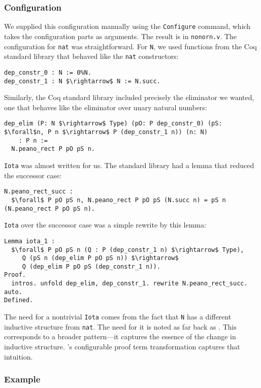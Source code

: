 \subsubsection{Configuration}
We supplied this configuration manually using the \lstinline{Configure} command,
which takes the configuration parts as arguments.
The result is in \lstinline{nonorn.v}.
The configuration for \lstinline{nat} was straightforward.
For \lstinline{N}, we used functions from the Coq standard library that
behaved like the \lstinline{nat} constructors:

\begin{lstlisting}
dep_constr_0 : N := 0%N.
dep_constr_1 : N $\rightarrow$ N := N.succ.
\end{lstlisting}
Similarly, the Coq standard library included precisely the eliminator we wanted, one that behaves
like the eliminator over unary natural numbers:

\begin{lstlisting}
dep_elim (P: N $\rightarrow$ Type) (pO: P dep_constr_0) (pS: $\forall$n, P n $\rightarrow$ P (dep_constr_1 n)) (n: N) 
    : P n :=
  N.peano_rect P pO pS n.
\end{lstlisting}
\lstinline{Iota} was almost written for us.
The standard library had a lemma that reduced the successor case:

\begin{lstlisting}
N.peano_rect_succ :
  $\forall$ P pO pS n, N.peano_rect P pO pS (N.succ n) = pS n (N.peano_rect P pO pS n).
\end{lstlisting}
\lstinline{Iota} over the successor case was a simple rewrite by this lemma:

\begin{lstlisting}
Lemma iota_1 :
  $\forall$ P pO pS n (Q : P (dep_constr_1 n) $\rightarrow$ Type),
     Q (pS n (dep_elim P pO pS n)) $\rightarrow$
     Q (dep_elim P pO pS (dep_constr_1 n)).
Proof.
  intros. unfold dep_elim, dep_constr_1. rewrite N.peano_rect_succ. auto.
Defined.
\end{lstlisting}

The need for a nontrivial \lstinline{Iota} comes from the fact that \lstinline{N} has a different
inductive structure from \lstinline{nat}.
The need for it is noted as far back as \citet{magaud2000changing}.
This corresponds to a broader pattern---it captures the essence of the change in inductive structure.
\toolname's configurable proof term transformation captures that intuition.

\subsubsection{Example}

